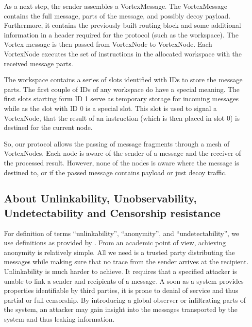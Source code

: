 \documentclass[10pt,journal,compsoc,twocolumn,twoside]{IEEEtran}
\begin{document}
As a next step, the sender assembles a VortexMessage. The VortexMessage contains the full message, parts of the message, and possibly decoy payload. Furthermore, it contains the previously built routing block and some additional information in a header required for the protocol (such as the workspace). The Vortex message is then passed from VortexNode to VortexNode. Each VortexNode executes the set of instructions in the allocated workspace with the received message parts. 

The workspace contains a series of slots identified with IDs to store the message parts. The first couple of IDs of any workspace do have a special meaning. The first slots starting form ID 1 serve as temporary storage for incoming messages while as the slot with ID 0 is a special slot. This slot is used to signal a VortexNode, that the result of an instruction (which is then placed in slot 0) is destined for the current node.

So, our protocol allows the passing of message fragments through a mesh of VortexNodes. Each node is aware of the sender of a message and the receiver of the processed result. However, none of the nodes is aware where the message is destined to, or if the passed message contains payload or just decoy traffic. %

\subsection{About Unlinkability, Unobservability, Undetectability and Censorship resistance}
For definition of terms ``unlinkability'', ``anonymity'', and ``undetectability'', we use definitions as provided by \cite{anon_terminology}. From an academic point of view, achieving anonymity is relatively simple. All we need is a trusted party distributing the messages while making sure that no trace from the sender arrives at the recipient. Unlinkability is much harder to achieve. It requires that a specified attacker is unable to link a sender and recipients of a message. A soon as a system provides properties identifiable by third parties, it is prone to denial of service and thus partial or full censorship. By introducing a global observer or infiltrating parts of the system, an attacker may gain insight into the messages transported by the system and thus leaking information.
\end{document}
